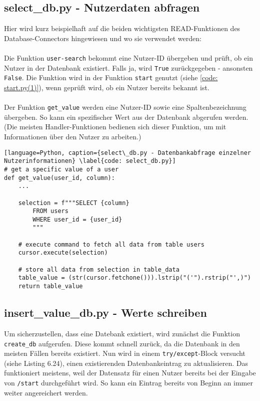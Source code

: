         \subsection{select\_db.py - Nutzerdaten abfragen} \label{Implementierung: select_db.py}
            Hier wird kurz beispielhaft auf die beiden wichtigsten READ-Funktionen des Database-Connectors hingewiesen und wo sie verwendet werden: \\
            \\
            Die Funktion \verb|user-search| bekommt eine Nutzer-ID übergeben und prüft, ob ein Nutzer in der Datenbank existiert. Falls ja, wird \verb|True| zurückgegeben - ansonsten \verb|False|. Die Funktion wird in der Funktion \verb|start| genutzt (siehe \ref*{code: start.py(1)}), wenn geprüft wird, ob ein Nutzer bereits bekannt ist.\\ 
            \\
            Der Funktion \verb|get_value| werden eine Nutzer-ID sowie eine Spaltenbezeichnung übergeben. So kann ein spezifischer Wert aus der Datenbank abgerufen werden. (Die meisten Handler-Funktionen bedienen sich dieser Funktion, um mit Informationen über den Nutzer zu arbeiten.) 
                \begin{lstlisting}[language=Python, caption={select\_db.py - Datenbankabfrage einzelner Nutzerinformationen} \label{code: select_db.py}]
# get a specific value of a user
def get_value(user_id, column):
    ...

    selection = f"""SELECT {column}
        FROM users
        WHERE user_id = {user_id}
        """

    # execute command to fetch all data from table users
    cursor.execute(selection)

    # store all data from selection in table_data
    table_value = (str(cursor.fetchone())).lstrip("('").rstrip("',)")
    return table_value
                \end{lstlisting}

        \subsection{insert\_value\_db.py - Werte schreiben} \label{Implementierung: insert_value_db.py}
            Um sicherzustellen, dass eine Datebank existiert, wird zunächst die Funktion \verb|create_db| aufgerufen. Diese kommt schnell zurück, da die Datenbank in den meisten Fällen bereits existiert. Nun wird in einem \verb|try/except|-Block versucht (siehe Listing 6.24), einen existierenden Datenbankeintrag zu aktualisieren. Das funktioniert meistens, weil der Datensatz für einen Nutzer bereits bei der Eingabe von \verb|/start| durchgeführt wird. So kann ein Eintrag bereits von Beginn an immer weiter angereichert werden.


